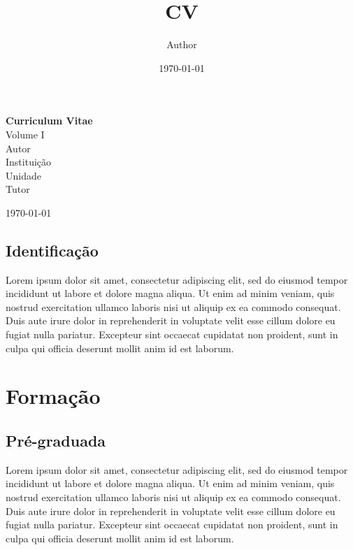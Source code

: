 \documentclass{report}
\title{CV}
\author{Author}
\date{\today}
\begin{document}
\begin{titlepage}

  \centering
  
  \vspace*{\fill}
  
  {\Huge\textbf{Curriculum Vitae}}\\[0.5cm]
  Volume I\\
  \vspace*{\fill}
  {\large Autor}\\[3.5cm]
  
  {\large Instituição}\\[0.5cm]
  {\large Unidade}\\[0.5cm]
  {\large Tutor}\\
  
  \vspace*{\fill}
  
  \today %
  
  \vspace*{\fill}

\end{titlepage}

\tableofcontents

\section*{Identificação}
Lorem ipsum dolor sit amet, consectetur adipiscing elit, sed do eiusmod tempor incididunt ut labore et dolore magna aliqua. Ut enim ad minim veniam, quis nostrud exercitation ullamco laboris nisi ut aliquip ex ea commodo consequat. Duis aute irure dolor in reprehenderit in voluptate velit esse cillum dolore eu fugiat nulla pariatur. Excepteur sint occaecat cupidatat non proident, sunt in culpa qui officia deserunt mollit anim id est laborum.

\chapter{Formação}

\section{Pré-graduada}
Lorem ipsum dolor sit amet, consectetur adipiscing elit, sed do eiusmod tempor incididunt ut labore et dolore magna aliqua. Ut enim ad minim veniam, quis nostrud exercitation ullamco laboris nisi ut aliquip ex ea commodo consequat. Duis aute irure dolor in reprehenderit in voluptate velit esse cillum dolore eu fugiat nulla pariatur. Excepteur sint occaecat cupidatat non proident, sunt in culpa qui officia deserunt mollit anim id est laborum.
\end{document}

